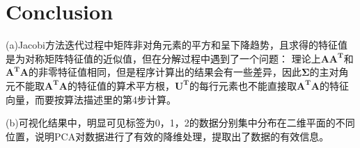 \documentclass{ctexart}
\begin{document}
	\section{Conclusion}
	(a)Jacobi方法迭代过程中矩阵非对角元素的平方和呈下降趋势，且求得的特征值是为对称矩阵特征值的近似值，但在分解过程中遇到了一个问题：
	理论上$\mathbf{AA^T}$和$\mathbf{A^TA}$的非零特征值相同，但是程序计算出的结果会有一些差异，因此$\mathbf{\Sigma}$的主对角元不能取$\mathbf{A^TA}$的特征值的算术平方根，$\mathbf{U^T}$的每行元素也不能直接取$\mathbf{A^TA}$的特征向量，而要按算法描述里的第4步计算。
	
	(b)可视化结果中，明显可见标签为0，1，2的数据分别集中分布在二维平面的不同位置，说明PCA对数据进行了有效的降维处理，提取出了数据的有效信息。
	
	
	
    
\end{document}
